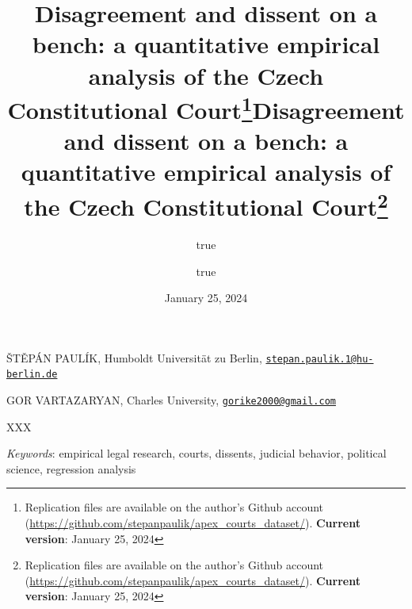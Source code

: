 \documentclass[
  11pt,
]{article}
\title{Disagreement and dissent on a bench: a quantitative empirical
analysis of the Czech Constitutional Court\thanks{Replication files are
available on the author's Github account
(\url{https://github.com/stepanpaulik/apex_courts_dataset/}).
\textbf{Current version}: January 25, 2024}}
\author{true \and true}
\date{January 25, 2024}
\title{Disagreement and dissent on a bench: a quantitative empirical
analysis of the Czech Constitutional Court\thanks{Replication files are
available on the author's Github account
(\url{https://github.com/stepanpaulik/apex_courts_dataset/}).
\textbf{Current version}: January 25, 2024}  }
\date{}
\renewenvironment{abstract}
 {{%
    \setlength{\leftmargin}{0mm}
    \setlength{\rightmargin}{\leftmargin}%
  }%
  \relax}
 {\endlist}
\begin{document}



{%
\setlength{\parindent}{0pt}
\thispagestyle{plain}
{%
\maketitle  %

}




{
   \vskip 13.5pt\relax \normalsize\fontsize{11}{12}
   \MakeUppercase{Štěpán Paulík}, \small{Humboldt Universität zu Berlin,
\href{mailto:stepan.paulik.1@hu-berlin.de}{\nolinkurl{stepan.paulik.1@hu-berlin.de}}}   \par \vskip -3.5pt \MakeUppercase{Gor
Vartazaryan}, \small{Charles University,
\href{mailto:gorike2000@gmail.com}{\nolinkurl{gorike2000@gmail.com}}}   

}

}








\begin{abstract}


    \vskip 8.5pt %

\noindent \small{XXX}


\vskip 8.5pt \noindent \emph{Keywords}: empirical legal research,
courts, dissents, judicial behavior, political science, regression
analysis \par




\end{abstract}


\vskip -8.5pt

{
\hypersetup{linkcolor=black}
\setcounter{tocdepth}{2}
\tableofcontents
}


{
\setcounter{tocdepth}{2}
\tableofcontents
}

\setlength{\parindent}{16pt}
\setlength{\parskip}{0pt}
\end{document}

